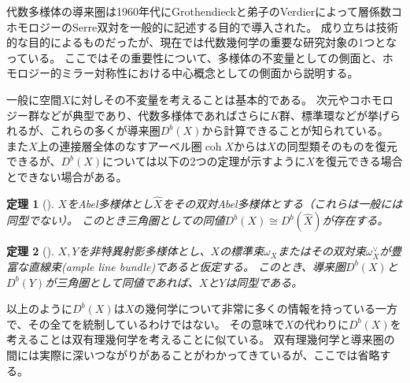\documentclass[uplatex,a4paper,dvipdfmx]{jsarticle}
\theoremstyle{plain}
\newtheorem{theorem}{定理}[section]
\theoremstyle{definition}
\DeclareMathOperator{\coh}{\mathrm{coh}}
\begin{document}
代数多様体の導来圏は1960年代にGrothendieckと弟子のVerdierによって層係数コホモロジーのSerre双対を一般的に記述する目的で導入された。
成り立ちは技術的な目的によるものだったが、現在では代数幾何学の重要な研究対象の1つとなっている。
ここではその重要性について、多様体の不変量としての側面と、ホモロジー的ミラー対称性における中心概念としての側面から説明する。

一般に空間$X$に対しその不変量を考えることは基本的である。
次元やコホモロジー群などが典型であり、代数多様体であればさらに$K$群、標準環などが挙げられるが、これらの多くが導来圏$D^b(X)$から計算できることが知られている。
また$X$上の連接層全体のなすアーベル圏$\coh X$からは$X$の同型類そのものを復元できるが、$D^b(X)$については以下の2つの定理が示すように$X$を復元できる場合とできない場合がある。
\begin{theorem}[\cite{MR607081}]\label{mukai}
	$X$をAbel多様体とし$\hat{X}$をその双対Abel多様体とする（これらは一般には同型でない）。
	このとき三角圏としての同値$D^b(X) \cong D^b(\hat{X})$が存在する。
\end{theorem}
\begin{theorem}[\cite{MR1818984}]
	$X, Y$を非特異射影多様体とし、$X$の標準束$\omega_X$またはその双対束$\omega_X^\vee$が豊富な直線束(ample line bundle)であると仮定する。
	このとき、導来圏$D^b(X)$と$D^b(Y)$が三角圏として同値であれば、$X$と$Y$は同型である。
\end{theorem}
以上のように$D^b(X)$は$X$の幾何学について非常に多くの情報を持っている一方で、その全てを統制しているわけではない。
その意味で$X$の代わりに$D^b(X)$を考えることは双有理幾何学を考えることに似ている。
双有理幾何学と導来圏の間には実際に深いつながりがあることがわかってきているが、ここでは省略する。
\end{document}
